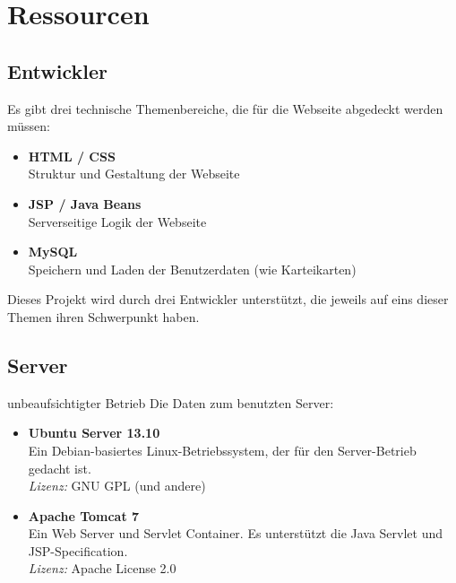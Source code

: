 \section{Ressourcen}

\subsection{Entwickler}
Es gibt drei technische Themenbereiche, die für die Webseite abgedeckt werden müssen:
\begin{itemize}
	\item \textbf{HTML / CSS} \\
	Struktur und Gestaltung der Webseite
	\item \textbf{JSP / Java Beans} \\
	Serverseitige Logik der Webseite
	\item \textbf{MySQL} \\
	Speichern und Laden der Benutzerdaten (wie Karteikarten)
\end{itemize}
Dieses Projekt wird durch drei Entwickler unterstützt, die jeweils auf eins dieser Themen ihren Schwerpunkt haben.

\subsection{Server}
unbeaufsichtigter Betrieb
Die Daten zum benutzten Server:
\begin{itemize}
	\item \textbf{Ubuntu Server 13.10} \\
	Ein Debian-basiertes Linux-Betriebssystem, der für den Server-Betrieb gedacht ist. \\
	\textit{Lizenz:} GNU GPL (und andere)
	\item \textbf{Apache Tomcat 7} \\
	Ein Web Server und Servlet Container. Es unterstützt die Java Servlet  und JSP-Specification. \\
	\textit{Lizenz:} Apache License 2.0
\end{itemize}

